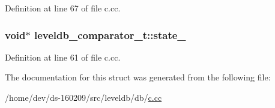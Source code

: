 Definition at line 67 of file c.\+cc.

\hypertarget{structleveldb__comparator__t_a720da927befa8098f21437c663d0b0e2}{}
\subsubsection[{state\+\_\+}]{\setlength{\rightskip}{0pt plus 5cm}void$\ast$ leveldb\+\_\+comparator\+\_\+t\+::state\+\_\+}\label{structleveldb__comparator__t_a720da927befa8098f21437c663d0b0e2}


Definition at line 61 of file c.\+cc.



The documentation for this struct was generated from the following file\+:\begin{DoxyCompactItemize}
\item 
/home/dev/ds-\/160209/src/leveldb/db/\hyperlink{c_8cc}{c.\+cc}\end{DoxyCompactItemize}
